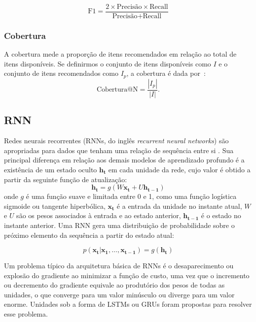 \begin{equation}
  \text{F1} = \frac{2 \times \text{Precisão} \times \text{Recall}}{\text{Precisão} + \text{Recall}}
\end{equation}

  \subsubsection{Cobertura}
  A cobertura mede a proporção de itens recomendados em relação ao total de
  itens disponíveis. Se definirmos o conjunto de itens disponíveis como $I$ e o
  conjunto de itens recomendados como $I_{p}$, a cobertura é dada por~\cite{sessionbaseddp}:
  \begin{equation}
    \text{Cobertura@N} = \frac{|I_{p}|}{|I|}.
  \end{equation}


\subsection{RNN}
Redes neurais recorrentes (RNNs, do inglês \textit{recurrent neural networks})
 são apropriadas para dados que tenham uma relação de sequência entre si
 \cite{gru4rec_1}. Sua principal diferença em relação aos demais modelos de
 aprendizado profundo é a existência de um estado oculto $\mathbf{h_t}$ em
 cada unidade da rede, cujo valor é obtido a partir da seguinte função de
 atualização:
\begin{equation}
    \mathbf{h_t} = g(W\mathbf{x_t} + U\mathbf{h_{t-1}})
\end{equation}
onde $g$ é uma função suave e limitada entre 0 e 1, como uma função logística
sigmoide ou tangente hiperbólica, $\mathbf{x_t}$ é a entrada da unidade no
instante atual, $W$ e $U$ são os pesos associados à entrada e ao estado
anterior, $\mathbf{h_{t-1}}$ é o estado no instante anterior. Uma RNN gera uma
distribuição de probabilidade sobre o próximo elemento da sequência a partir do
estado atual:

\begin{equation}
    p(\mathbf{x_t}|\mathbf{x_1},\ldots , \mathbf{x_{t-1}}) = g(\mathbf{h_t})
\end{equation}

Um problema típico da arquitetura básica de RNNs é o desaparecimento ou explosão
do gradiente ao minimizar a função de custo, uma vez que o incremento ou
decremento do gradiente equivale ao produtório dos pesos de todas as unidades, o
que converge para um valor minúsculo ou diverge para um valor enorme. Unidades
sob a forma de LSTMs ou GRUs foram propostas para resolver esse problema.



